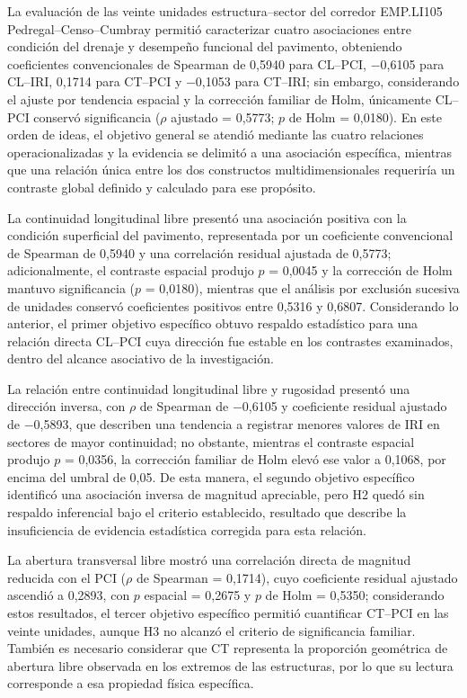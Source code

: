 \begingroup
\setlength{\emergencystretch}{2em}


La evaluación de las veinte unidades estructura--sector del corredor EMP.LI105 Pedregal--Censo--Cumbray permitió caracterizar cuatro asociaciones entre condición del drenaje y desempeño funcional del pavimento, obteniendo coeficientes convencionales de Spearman de 0,5940 para CL--PCI, $-$0,6105 para CL--IRI, 0,1714 para CT--PCI y $-$0,1053 para CT--IRI; sin embargo, considerando el ajuste por tendencia espacial y la corrección familiar de Holm, únicamente CL--PCI conservó significancia ($\rho$ ajustado = 0,5773; $p$ de Holm = 0,0180). En este orden de ideas, el objetivo general se atendió mediante las cuatro relaciones operacionalizadas y la evidencia se delimitó a una asociación específica, mientras que una relación única entre los dos constructos multidimensionales requeriría un contraste global definido y calculado para ese propósito.

La continuidad longitudinal libre presentó una asociación positiva con la condición superficial del pavimento, representada por un coeficiente convencional de Spearman de 0,5940 y una correlación residual ajustada de 0,5773; adicionalmente, el contraste espacial produjo $p$ = 0,0045 y la corrección de Holm mantuvo significancia ($p$ = 0,0180), mientras que el análisis por exclusión sucesiva de unidades conservó coeficientes positivos entre 0,5316 y 0,6807. Considerando lo anterior, el primer objetivo específico obtuvo respaldo estadístico para una relación directa CL--PCI cuya dirección fue estable en los contrastes examinados, dentro del alcance asociativo de la investigación.

La relación entre continuidad longitudinal libre y rugosidad presentó una dirección inversa, con $\rho$ de Spearman de $-$0,6105 y coeficiente residual ajustado de $-$0,5893, que describen una tendencia a registrar menores valores de IRI en sectores de mayor continuidad; no obstante, mientras el contraste espacial produjo $p$ = 0,0356, la corrección familiar de Holm elevó ese valor a 0,1068, por encima del umbral de 0,05. De esta manera, el segundo objetivo específico identificó una asociación inversa de magnitud apreciable, pero H2 quedó sin respaldo inferencial bajo el criterio establecido, resultado que describe la insuficiencia de evidencia estadística corregida para esta relación.

La abertura transversal libre mostró una correlación directa de magnitud reducida con el PCI ($\rho$ de Spearman = 0,1714), cuyo coeficiente residual ajustado ascendió a 0,2893, con $p$ espacial = 0,2675 y $p$ de Holm = 0,5350; considerando estos resultados, el tercer objetivo específico permitió cuantificar CT--PCI en las veinte unidades, aunque H3 no alcanzó el criterio de significancia familiar. También es necesario considerar que CT representa la proporción geométrica de abertura libre observada en los extremos de las estructuras, por lo que su lectura corresponde a esa propiedad física específica.

